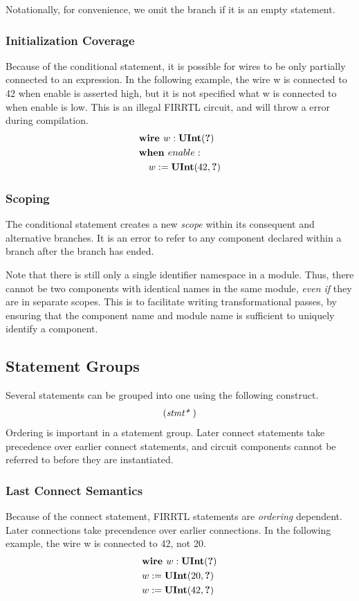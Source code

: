 \documentclass[12pt]{article}
\begin{document}
Notationally, for convenience, we omit the  branch if it is an empty statement. 

\subsubsection{Initialization Coverage}
Because of the conditional statement, it is possible for wires to be only partially connected to an expression. In the following example, the wire w is connected to 42 when enable is asserted high, but it is not specified what w is connected to when enable is low. This is an illegal FIRRTL circuit, and will throw a  error during compilation.
\[
\begin{aligned}
&\text{\bf wire\ } w : \text{\bf UInt}(\text{\bf ?}) \\
&\text{\bf when\ } enable : \\
&\quad w := \text{\bf UInt}(42, \text{\bf ?}) \\
\end{aligned}
\]

\subsubsection{Scoping}
The conditional statement creates a new {\em scope} within its consequent and alternative branches. It is an error to refer to any component declared within a branch after the branch has ended.

Note that there is still only a single identifier namespace in a module. Thus, there cannot be two components with identical names in the same module, {\em even if} they are in separate scopes. This is to facilitate writing transformational passes, by ensuring that the component name and module name is sufficient to uniquely identify a component.

\subsection{Statement Groups}
Several statements can be grouped into one using the following construct.
\[
\begin{aligned}
(\text{\em stmt*\ })
\end{aligned}
\]
Ordering is important in a statement group. Later connect statements take precedence over earlier connect statements, and circuit components cannot be referred to before they are instantiated.

\subsubsection{Last Connect Semantics}
Because of the connect statement, FIRRTL statements are {\em ordering} dependent. Later connections take precendence over earlier connections. In the following example, the wire w is connected to 42, not 20. 
\[
\begin{aligned}
&\text{\bf wire\ } w : \text{\bf UInt}(\text{\bf ?}) \\
&w := \text{\bf UInt}(20, \text{\bf ?}) \\
&w := \text{\bf UInt}(42, \text{\bf ?}) \\
\end{aligned}
\]
\end{document}

